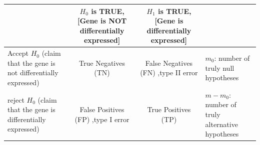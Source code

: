 \documentclass[12pt,]{krantz}
\begin{document}
\begin{longtable}[]{@{}lccl@{}}
\toprule
\begin{minipage}[b]{0.17\columnwidth}\raggedright
\strut
\end{minipage} & \begin{minipage}[b]{0.22\columnwidth}\centering
\(H_0\) is
TRUE,
{[}Gene is NOT
differentially
expressed{]}\strut
\end{minipage} & \begin{minipage}[b]{0.22\columnwidth}\centering
\(H_1\) is
TRUE,
{[}Gene is
differentially
expressed{]}\strut
\end{minipage} & \begin{minipage}[b]{0.27\columnwidth}\raggedright
\strut
\end{minipage}\tabularnewline
\midrule
\endhead
\begin{minipage}[t]{0.17\columnwidth}\raggedright
Accept \(H_0\)
(claim that
the gene is not
differentially
expressed)\strut
\end{minipage} & \begin{minipage}[t]{0.22\columnwidth}\centering
True Negatives (TN)\strut
\end{minipage} & \begin{minipage}[t]{0.22\columnwidth}\centering
False Negatives (FN)
,type II error\strut
\end{minipage} & \begin{minipage}[t]{0.27\columnwidth}\raggedright
\(m_0\): number of truly
null hypotheses\strut
\end{minipage}\tabularnewline
\begin{minipage}[t]{0.17\columnwidth}\raggedright
reject \(H_0\)
(claim that
the gene is
differentially
expressed)\strut
\end{minipage} & \begin{minipage}[t]{0.22\columnwidth}\centering
False Positives (FP)
,type I error\strut
\end{minipage} & \begin{minipage}[t]{0.22\columnwidth}\centering
True Positives (TP)\strut
\end{minipage} & \begin{minipage}[t]{0.27\columnwidth}\raggedright
\(m-m_0\): number of
truly alternative
hypotheses\strut
\end{minipage}\tabularnewline
\bottomrule
\end{longtable}
\end{document}
